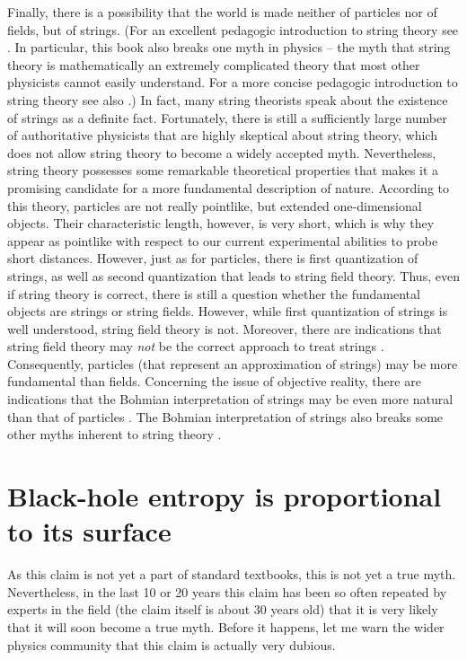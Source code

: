 \documentclass[12pt]{article}
\begin{document}
Finally, there is a possibility that the world is made
neither of particles nor of fields, but of strings.
(For an excellent pedagogic introduction to string theory see 
\cite{zwie}. In particular, this book also breaks 
one myth in physics -- the myth that string theory is mathematically 
an extremely 
complicated theory that most other physicists
cannot easily understand. For a more concise pedagogic introduction
to string theory see also \cite{szabo}.) In fact, many string theorists
speak about the existence of strings as a definite fact. Fortunately,
there is still a sufficiently large number of authoritative physicists 
that are highly skeptical about string theory, which does not allow
string theory to become a widely accepted myth. 
Nevertheless, string theory possesses some remarkable 
theoretical properties that makes it
a promising candidate for a more fundamental description of nature.
According to this theory, particles are not really pointlike, 
but extended one-dimensional objects. Their characteristic length, 
however, is very short, 
which is why they appear as pointlike with respect to our 
current experimental abilities to probe short distances.
However, just as for particles, there is first quantization of 
strings, as well as second quantization that leads to string field theory.
Thus, even if string theory is correct, there is still 
a question whether the fundamental objects are strings or 
string fields. However, while first quantization of strings 
is well understood, string field theory is not. Moreover, 
there are indications that string field theory may {\em not} be
the correct approach to treat strings \cite{polc}.
Consequently, particles (that represent an approximation of strings) 
may be more fundamental than fields. Concerning the issue of 
objective reality, there are indications 
that the Bohmian interpretation of strings may be even more 
natural than that of particles \cite{nikolstr1,nikolstr3}. The Bohmian 
interpretation of strings also breaks some other myths 
inherent to string theory \cite{nikolstr2}.     

\section{Black-hole entropy is proportional to its surface}
\label{BH}

As this claim is not yet a part of standard textbooks,
this is not yet a true myth. Nevertheless, 
in the last 10 or 20 years
this claim has been so often repeated by experts in the field
(the claim itself is about 30 years old) 
that it is very likely that it will soon become a true myth.
Before it happens, let me warn the wider physics community
that this claim is actually very dubious. 
\end{document}
